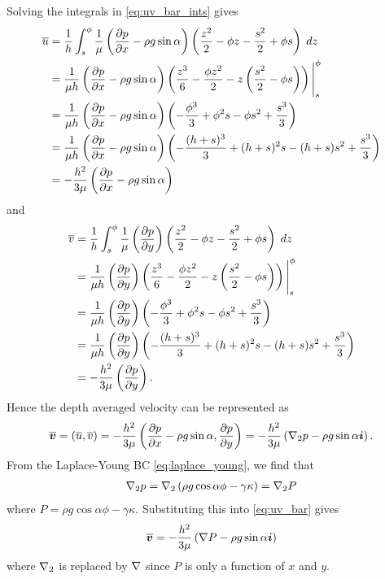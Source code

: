 Solving the integrals in \cref{eq:uv_bar_ints} gives 
\begin{align}
    \nonumber \overline{u} &= \frac{1}{h} \int_{s}^{\phi} \frac{1}{\mu} \left( \frac{\partial p}{\partial x} - \rho g \sin\alpha \right) \left( \frac{z^2}{2} - \phi z - \frac{s^2}{2} + \phi s \right)  \; dz\\
    \nonumber &= \frac{1}{\mu h} \left( \frac{\partial p}{\partial x} - \rho g \sin\alpha \right) \left( \frac{z^3}{6} - \frac{\phi z^2}{2} - z\left( \frac{s^2}{2} - \phi s \right) \right) \Bigg|_{s}^{\phi}\\
    \nonumber &= \frac{1}{\mu h} \left( \frac{\partial p}{\partial x} - \rho g \sin\alpha \right) \left( -\frac{\phi^3}{3} + \phi^2s - \phi s^2 + \frac{s^3}{3} \right)\\
    \nonumber &=  \frac{1}{\mu h} \left( \frac{\partial p}{\partial x} - \rho g \sin\alpha \right) \left( -\frac{(h+s)^3}{3} + (h+s)^2s - (h+s) s^2 + \frac{s^3}{3} \right)\\
    &= -\frac{h^2}{3\mu} \left( \frac{\partial p}{\partial x} - \rho g \sin\alpha \right)
    \label{eq:u_bar}
\end{align}
and 
\begin{align}
    \nonumber \overline{v} &= \frac{1}{h} \int_{s}^{\phi} \frac{1}{\mu} \left( \frac{\partial p}{\partial y} \right) \left( \frac{z^2}{2} - \phi z - \frac{s^2}{2} + \phi s \right)  \; dz\\
    \nonumber &= \frac{1}{\mu h} \left( \frac{\partial p}{\partial y} \right) \left( \frac{z^3}{6} - \frac{\phi z^2}{2} - z\left( \frac{s^2}{2} - \phi s \right) \right) \Bigg|_{s}^{\phi}\\
    \nonumber &= \frac{1}{\mu h} \left( \frac{\partial p}{\partial y} \right) \left( -\frac{\phi^3}{3} + \phi^2s - \phi s^2 + \frac{s^3}{3} \right)\\
    \nonumber &=  \frac{1}{\mu h} \left( \frac{\partial p}{\partial y} \right) \left( -\frac{(h+s)^3}{3} + (h+s)^2s - (h+s) s^2 + \frac{s^3}{3} \right)\\
    &= -\frac{h^2}{3\mu} \left( \frac{\partial p}{\partial y} \right). 
    \label{eq:v_bar}
\end{align}
Hence the depth averaged velocity can be represented as 
\begin{align}
    \overline{\boldsymbol{v}} = \left( \overline{u}, \overline{v} \right) = -\frac{h^2}{3\mu} \left( \frac{\partial p}{\partial x} - \rho g \sin \alpha, \frac{\partial p}{\partial y} \right) = -\frac{h^2}{3\mu} \left( \nabla_2 p - \rho g \sin \alpha \boldsymbol{i} \right).
    \label{eq:uv_bar}
\end{align}
From the Laplace-Young BC \cref{eq:laplace_young}, we find that 
\begin{align}
    \nabla_2 p = \nabla_2 \left( \rho g \cos \alpha \phi - \gamma \kappa \right) = \nabla_2 P
    \label{eq:grad2_p}
\end{align}
where $P = \rho g \cos \alpha \phi - \gamma \kappa$. Substituting this into \cref{eq:uv_bar} gives 
\begin{align}
    \overline{\boldsymbol{v}} = -\frac{h^2}{3\mu} \left( \nabla P - \rho g \sin \alpha \boldsymbol{i} \right)
    \label{eq:uv_bar_final}
\end{align}
where $\nabla_2$ is replaced by $\nabla$ since $P$ is only a function of $x$ and $y$. 


